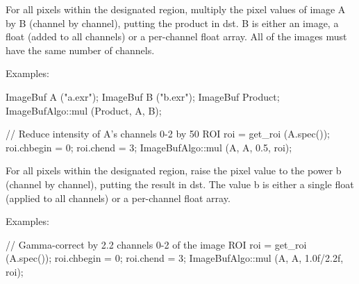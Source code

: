  

For all pixels within the designated region, multiply the pixel values
of image {\cf A} by {\cf B} (channel by channel), putting the product in
{\cf dst}.  {\cf B} is either an image,
a float (added to all channels) or a per-channel float array.
All of the images must have the same number of channels.

\smallskip
\noindent Examples:
\begin{code}
    ImageBuf A ("a.exr");
    ImageBuf B ("b.exr");
    ImageBuf Product;
    ImageBufAlgo::mul (Product, A, B);

    // Reduce intensity of A's channels 0-2 by 50%
    ROI roi = get_roi (A.spec());
    roi.chbegin = 0;  roi.chend = 3;
    ImageBufAlgo::mul (A, A, 0.5, roi);
\end{code}
\apiend


 
\NEW  %

For all pixels within the designated region, raise the pixel value to the
power {\cf b} (channel by channel), putting the result in
{\cf dst}.  The value {\cf b} is either a single 
float (applied to all channels) or a per-channel float array.

\smallskip
\noindent Examples:
\begin{code}
    // Gamma-correct by 2.2 channels 0-2 of the image
    ROI roi = get_roi (A.spec());
    roi.chbegin = 0;  roi.chend = 3;
    ImageBufAlgo::mul (A, A, 1.0f/2.2f, roi);
\end{code}
\apiend


